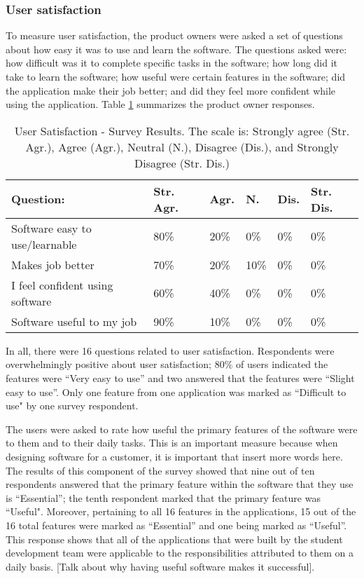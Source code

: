\subsubsection{User satisfaction}
To measure user satisfaction, the product owners were asked a set of questions about how easy it was to use and learn the software. The questions asked were: how difficult was it to complete specific tasks in the software; how long did it take to learn the software; how useful were certain features in the software; did the application make their job better; and did they feel more confident while using the application. Table \ref{table:usersatisfaction} summarizes the product owner responses.

\begin{table}
\caption{User Satisfaction - Survey Results. The scale is: Strongly agree (Str. Agr.), Agree (Agr.), Neutral (N.), Disagree (Dis.), and Strongly Disagree (Str. Dis.)}
\label{table:usersatisfaction}
\begin{tabular}{p{2.6cm}p{.75cm}p{.75cm}p{.75cm}p{.75cm}p{.75cm}}
Question: & Str. Agr. & Agr. & N. & Dis. & Str. Dis. \\
 \hline
Software easy to use/learnable & 80\% & 20\% & 0\% & 0\% & 0\% \\
Makes job better & 70\% & 20\% & 10\% & 0\% & 0\% \\
I feel confident using software & 60\% & 40\% & 0\% & 0\% & 0\% \\
Software useful to my job & 90\% & 10\% & 0\% & 0\% & 0\% \\
\end{tabular}
\end{table}

In all, there were 16 questions related to user satisfaction. Respondents were overwhelmingly positive about user satisfaction; 80\% of users indicated the features were ``Very easy to use'' and two answered that the features were ``Slight easy to use''. Only one feature from one application was marked as ``Difficult to use" by one survey respondent.

The users were asked to rate how useful the primary features of the software were to them and to their daily tasks. This is an important measure because when designing software for a customer, it is important that {insert more words here}. The results of this component of the survey showed that nine out of ten respondents answered that the primary feature within the software that they use is ``Essential''; the tenth respondent marked that the primary feature was ``Useful". Moreover, pertaining to all 16 features in the applications, 15 out of the 16 total features were marked as ``Essential'' and one being marked as ``Useful''. This response shows that all of the applications that were built by the student development team were applicable to the responsibilities attributed to them on a daily basis. [Talk about why having useful software makes it successful].

